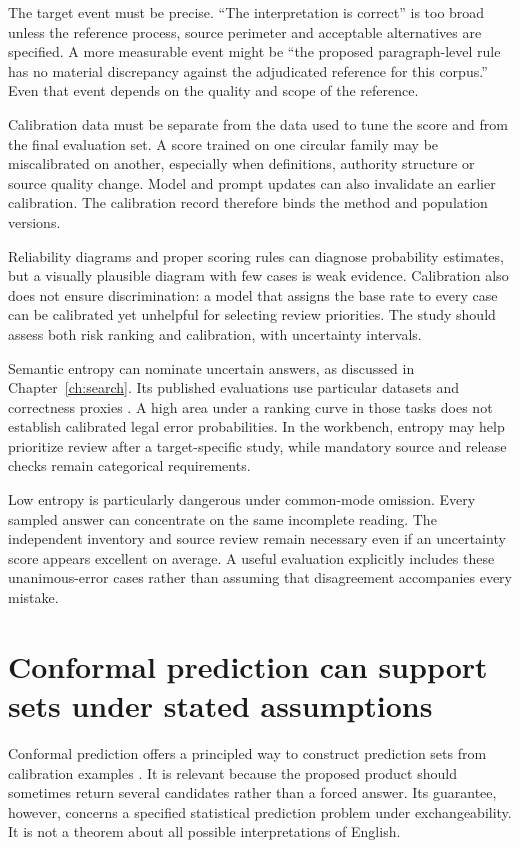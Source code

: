 The target event must be precise. ``The interpretation is correct'' is too broad
unless the reference process, source perimeter and acceptable alternatives are
specified. A more measurable event might be ``the proposed paragraph-level rule
has no material discrepancy against the adjudicated reference for this corpus.''
Even that event depends on the quality and scope of the reference.

Calibration data must be separate from the data used to tune the score and from
the final evaluation set. A score trained on one circular family may be
miscalibrated on another, especially when definitions, authority structure or
source quality change. Model and prompt updates can also invalidate an earlier
calibration. The calibration record therefore binds the method and population
versions.

Reliability diagrams and proper scoring rules can diagnose probability estimates,
but a visually plausible diagram with few cases is weak evidence. Calibration
also does not ensure discrimination: a model that assigns the base rate to every
case can be calibrated yet unhelpful for selecting review priorities. The study
should assess both risk ranking and calibration, with uncertainty intervals.

Semantic entropy can nominate uncertain answers, as discussed in
Chapter~\ref{ch:search}. Its published evaluations use particular datasets and
correctness proxies \citep{semantic2023}. A high area under a ranking curve in
those tasks does not establish calibrated legal error probabilities. In the
workbench, entropy may help prioritize review after a target-specific study, while
mandatory source and release checks remain categorical requirements.

Low entropy is particularly dangerous under common-mode omission. Every sampled
answer can concentrate on the same incomplete reading. The independent inventory
and source review remain necessary even if an uncertainty score appears excellent
on average. A useful evaluation explicitly includes these unanimous-error cases
rather than assuming that disagreement accompanies every mistake.

\section{Conformal prediction can support sets under stated assumptions}
\label{merge:M09:09}


Conformal prediction offers a principled way to construct prediction sets from
calibration examples \citep[section 1.1 and appendix D]{conformal2022}. It is
relevant because the proposed product should sometimes return several candidates
rather than a forced answer. Its guarantee, however, concerns a specified
statistical prediction problem under exchangeability. It is not a theorem about
all possible interpretations of English.


